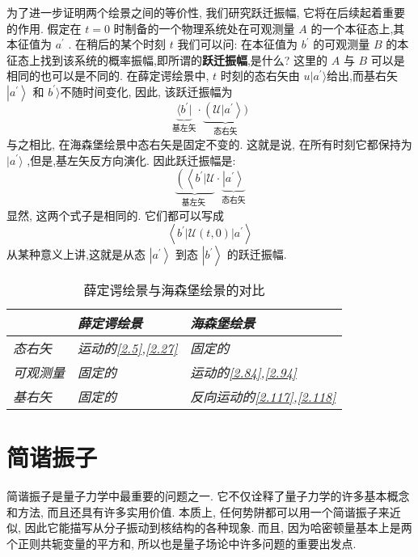 为了进一步证明两个绘景之间的等价性, 我们研究跃迁振幅, 它将在后续起着重要的作用. 假定在 $t = 0$ 时制备的一个物理系统处在可观测量 $A$ 的一个本征态上,其本征值为 ${a}^{\prime }$ . 在稍后的某个时刻 $t$ 我们可以问: 在本征值为 ${b}^{\prime }$ 的可观测量 $B$ 的本征态上找到该系统的概率振幅,即所谓的\textbf{跃迁振幅},是什么? 这里的 $A$ 与 $B$ 可以是相同的也可以是不同的. 在薛定谔绘景中, $t$ 时刻的态右矢由 $u | {a}^{\prime }\rangle$给出,而基右矢 $\left| {a}^{\prime }\right\rangle$ 和 ${b}^{\prime }\rangle$不随时间变化, 因此, 该跃迁振幅为
\begin{equation}
	\underset{\text{基左矢}}{\underbrace{\langle b^\prime |}} \cdot \underset{\text{态右矢}}{\underbrace{\left(\mathcal{U}| {a}^{\prime }\right\rangle )}}
\end{equation}
与之相比, 在海森堡绘景中态右矢是固定不变的. 这就是说, 在所有时刻它都保持为$|{a}^{\prime }\rangle$ ,但是,基左矢反方向演化. 因此跃迁振幅是:
\begin{equation}
	\underset{\text{基左矢 }}{\underbrace{\left( \left\langle {b}^{\prime } | \mathcal{U}\right. \right. }} \cdot \underset{\text{态右矢}}{\underbrace{\left| {a}^{\prime }\right\rangle}}
\end{equation}
显然, 这两个式子是相同的. 它们都可以写成
\begin{equation}
	\left\langle {{b}^{\prime }\left| {\mathcal{U}\left( {t,0}\right) }\right| {a}^{\prime }}\right\rangle
\end{equation}
从某种意义上讲,这就是从态 $\left| {a}^{\prime }\right\rangle$ 到态 $\left| {b}^{\prime }\right\rangle$ 的跃迁振幅.
\begin{table}[htbq]
	\caption{薛定谔绘景与海森堡绘景的对比}
	\centering
	\begin{tabular}{l|l|l}
		\hline
		& \textit{薛定谔绘景} & \textit{海森堡绘景} \\ \hline
		\textit{态右矢} & \textit{运动的\ref{2.5},\ref{2.27}} & \textit{固定的} \\
		\textit{可观测量} & \textit{固定的} & \textit{运动的\ref{2.84},\ref{2.94}} \\
		\textit{基右矢} & \textit{固定的} & \textit{反向运动的\ref{2.117},\ref{2.118}} \\ \hline
	\end{tabular}
\end{table}
\section{简谐振子}
简谐振子是量子力学中最重要的问题之一. 它不仅诠释了量子力学的许多基本概念和方法, 而且还具有许多实用价值. 本质上, 任何势阱都可以用一个简谐振子来近似, 因此它能描写从分子振动到核结构的各种现象. 而且, 因为哈密顿量基本上是两个正则共轭变量的平方和, 所以也是量子场论中许多问题的重要出发点.
